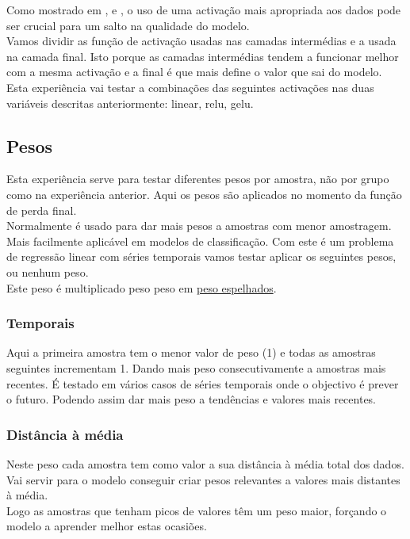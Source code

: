 Como mostrado em \cite{Vaswani2017}, e \cite{Liu2022} , o uso de uma activação mais apropriada aos dados pode ser crucial para um salto na qualidade do modelo.\\
Vamos dividir as função de activação usadas nas camadas intermédias e a usada na camada final. Isto porque as camadas intermédias tendem a funcionar melhor com a mesma activação e a final é que mais define o valor que sai do modelo.\\
Esta experiência vai testar a combinações das seguintes activações nas duas variáveis descritas anteriormente: linear, relu, gelu.\\


\subsection{Pesos}
Esta experiência serve para testar diferentes pesos por amostra, não por grupo como na experiência anterior. Aqui os pesos são aplicados no momento da função de perda final.\\
Normalmente é usado para dar mais pesos a amostras com menor amostragem. Mais facilmente aplicável em modelos de classificação. Com este é um problema de regressão linear com séries temporais vamos testar aplicar os seguintes pesos, ou nenhum peso.\\
Este peso é multiplicado peso peso em \hyperref[se:advancedloss]{peso espelhados}.


\subsubsection{Temporais}
Aqui a primeira amostra tem o menor valor de peso (1) e todas as amostras seguintes incrementam 1. Dando mais peso consecutivamente a amostras mais recentes. É testado em vários casos de séries temporais onde o objectivo é prever o futuro. Podendo assim dar mais peso a tendências e valores mais recentes.\\

\subsubsection{Distância à média}
Neste peso cada amostra tem como valor a sua distância à média total dos dados. Vai servir para o modelo conseguir criar pesos relevantes a valores mais distantes à média.\\
Logo as amostras que tenham picos de valores têm um peso maior, forçando o modelo a aprender melhor estas ocasiões.

